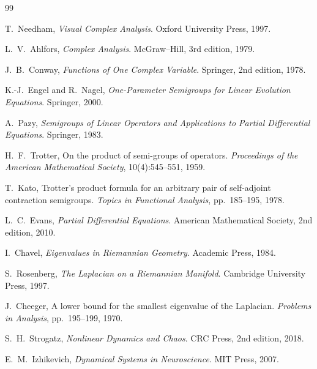 \documentclass[12pt, a4paper]{article}
\theoremstyle{remark}
\theoremstyle{definition}
\begin{document}
\begin{thebibliography}{99}

T.~Needham,
\newblock \emph{Visual Complex Analysis}.
\newblock Oxford University Press, 1997.

L.~V.~Ahlfors,
\newblock \emph{Complex Analysis}.
\newblock McGraw--Hill, 3rd edition, 1979.

J.~B.~Conway,
\newblock \emph{Functions of One Complex Variable}.
\newblock Springer, 2nd edition, 1978.

K.-J.~Engel and R.~Nagel,
\newblock \emph{One-Parameter Semigroups for Linear Evolution Equations}.
\newblock Springer, 2000.

A.~Pazy,
\newblock \emph{Semigroups of Linear Operators and Applications to Partial Differential Equations}.
\newblock Springer, 1983.

H.~F.~Trotter,
\newblock On the product of semi-groups of operators.
\newblock \emph{Proceedings of the American Mathematical Society},
  10(4):545--551, 1959.

T.~Kato,
\newblock Trotter's product formula for an arbitrary pair of self-adjoint contraction semigroups.
\newblock \emph{Topics in Functional Analysis}, pp.~185--195, 1978.

L.~C.~Evans,
\newblock \emph{Partial Differential Equations}.
\newblock American Mathematical Society, 2nd edition, 2010.

I.~Chavel,
\newblock \emph{Eigenvalues in Riemannian Geometry}.
\newblock Academic Press, 1984.

S.~Rosenberg,
\newblock \emph{The Laplacian on a Riemannian Manifold}.
\newblock Cambridge University Press, 1997.

J.~Cheeger,
\newblock A lower bound for the smallest eigenvalue of the Laplacian.
\newblock \emph{Problems in Analysis}, pp.~195--199, 1970.

S.~H.~Strogatz,
\newblock \emph{Nonlinear Dynamics and Chaos}.
\newblock CRC Press, 2nd edition, 2018.

E.~M.~Izhikevich,
\newblock \emph{Dynamical Systems in Neuroscience}.
\newblock MIT Press, 2007.


\end{thebibliography}
\end{document}
